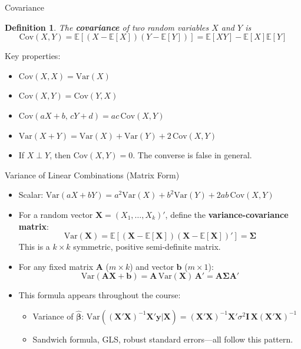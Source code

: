 \documentclass[aspectratio=169, handout, t]{beamer}
\newtheorem{defn}{Definition}
\numberwithin{equation}{section}
\begin{document}
\begin{frame}{Covariance}
\begin{defn}
The \textbf{covariance} of two random variables $X$ and $Y$ is
$$\text{Cov}(X,Y)=\mathbb{E}[(X-\mathbb{E}[X])(Y-\mathbb{E}[Y])]=\mathbb{E}[XY]-\mathbb{E}[X]\mathbb{E}[Y]$$
\end{defn}\pause
Key properties:
\begin{itemize}
\item $\text{Cov}(X,X)=\text{Var}(X)$
\item $\text{Cov}(X,Y)=\text{Cov}(Y,X)$
\item $\text{Cov}(aX+b,\,cY+d)=ac\,\text{Cov}(X,Y)$
\item $\text{Var}(X+Y)=\text{Var}(X)+\text{Var}(Y)+2\,\text{Cov}(X,Y)$\pause
\item If $X\perp Y$, then $\text{Cov}(X,Y)=0$. The converse is false in general.
\end{itemize}
\end{frame}


\begin{frame}{Variance of Linear Combinations (Matrix Form)}
\begin{itemize}
\item Scalar: $\text{Var}(aX+bY)=a^2\text{Var}(X)+b^2\text{Var}(Y)+2ab\,\text{Cov}(X,Y)$\pause
\item For a random vector $\bm{X}=(X_1,\ldots,X_k)'$, define the \textbf{variance-covariance matrix}:
$$\text{Var}(\bm{X})=\mathbb{E}[(\bm{X}-\mathbb{E}[\bm{X}])(\bm{X}-\mathbb{E}[\bm{X}])']=\bm{\Sigma}$$
This is a $k\times k$ symmetric, positive semi-definite matrix.\pause
\item For any fixed matrix $\bm{A}$ ($m\times k$) and vector $\bm{b}$ ($m \times 1$):
\[\text{Var}(\bm{A}\bm{X}+\bm{b})=\bm{A}\,\text{Var}(\bm{X})\,\bm{A}'=\bm{A}\bm{\Sigma}\bm{A}'\]\pause
\item This formula appears throughout the course:
\begin{itemize}
\item Variance of $\hat{\bm{\beta}}$: $\text{Var}((\bm{X}'\bm{X})^{-1}\bm{X}'\bm{y}|\bm{X})=(\bm{X}'\bm{X})^{-1}\bm{X}'\sigma^2\bm{I}\,\bm{X}(\bm{X}'\bm{X})^{-1}$
\item Sandwich formula, GLS, robust standard errors---all follow this pattern.
\end{itemize}
\end{itemize}
\end{frame}
\end{document}
